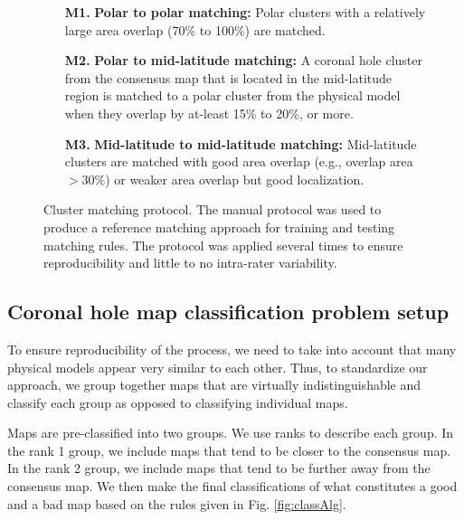 \documentclass[journal]{IEEEtran}
\begin{document}
\begin{figure}[!t]
\begin{itemize}
        \item[{\bf M1.}] {\bf Polar to polar matching:} Polar clusters with a relatively large area
        overlap (70\% to 100\%) are matched.
        \item[{\bf M2.}] {\bf Polar to mid-latitude matching:}
        A coronal hole cluster from the consensus map that is located
        in the mid-latitude region is matched to a polar cluster from
        the physical model when they overlap by at-least 15\% to 20\%, or more.
        \item[{\bf M3.}] {\bf Mid-latitude to mid-latitude matching:}
        Mid-latitude clusters are matched with good area overlap 
        (e.g., overlap area $>30\%$) or weaker area overlap but
        good localization.
\end{itemize}
        \caption{Cluster matching protocol. The manual protocol was used
        to produce a reference matching approach for training and
    testing matching rules. The protocol was applied several times to
    ensure reproducibility and little to no intra-rater variability.}
\label{fig:clusterMatchingManual}
\end{figure}




\subsection{Coronal hole map classification problem setup}\label{sec:map}
To ensure reproducibility of the process, we need to take into account that
    many physical models appear very similar to each other.
Thus, to standardize our approach, we group together
    maps that are virtually indistinguishable and 
    classify each group as opposed to classifying individual maps.

Maps are pre-classified into two
groups. We use ranks to describe each group. 
In the rank 1 group, we include maps that tend to be closer to the consensus map.
In the rank 2 group, we include maps that tend to be further away from the consensus map.
We then make the final classifications of what
constitutes a good and a bad map based on the rules given in Fig. \ref{fig:classAlg}.
\end{document}

